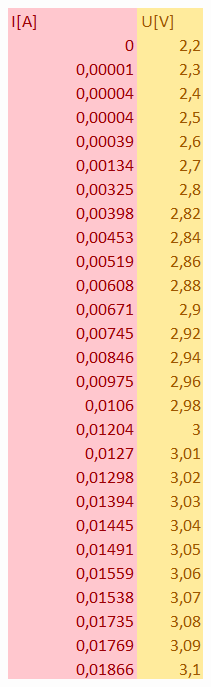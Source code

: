\documentclass{article}
\begin{document}
\begin{figure}[h!]
  \begin{subfigure}[b]{0.2\textwidth}
    \includegraphics[width=\linewidth]{Pomiary_Dioda_Niebieska.png}

\end{subfigure}
\end{figure}
\end{document}
